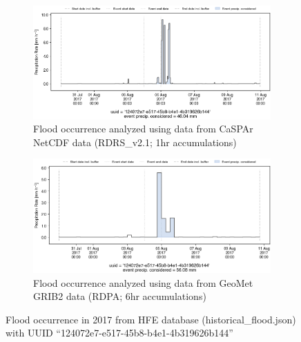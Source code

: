 \documentclass[10pt,a4paper,titlepage,parskip]{scrartcl}
\begin{document}
\begin{figure}[h]
	\begin{subfigure}[a]{1.0\textwidth}
		\centering
		\includegraphics[width=\linewidth]{figures/compare_Geomet_CaSPAr/interpolated_at_stations_occurrence_1054_identified-timesteps_RDRS_v2.1.png}
		\caption{Flood occurrence analyzed using data from CaSPAr NetCDF data (RDRS\_v2.1; 1hr accumulations)}
	\end{subfigure}
	\par\bigskip\bigskip
	\begin{subfigure}[b]{1.0\textwidth}
		\centering
		\includegraphics[width=\linewidth]{figures/compare_Geomet_CaSPAr/interpolated_at_stations_occurrence_1054_identified-timesteps_rdpa_10km_6f.png}
		\caption{Flood occurrence analyzed using data from GeoMet GRIB2 data (RDPA; 6hr accumulations)}
	\end{subfigure}
	\par\bigskip\bigskip
	\caption{Flood occurrence in 2017 from HFE database (historical\_flood.json) with UUID ``124072e7-e517-45b8-b4e1-4b319626b144''}
\end{figure}
\pagebreak
\end{document}
